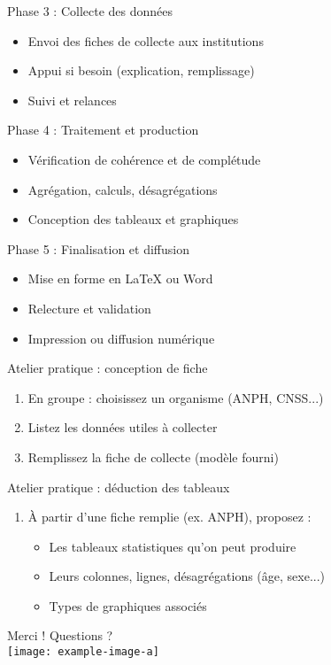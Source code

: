 \documentclass{beamer}
\begin{document}
\begin{frame}{Phase 3 : Collecte des données}
\begin{itemize}
    \item Envoi des fiches de collecte aux institutions
    \item Appui si besoin (explication, remplissage)
    \item Suivi et relances
\end{itemize}
\end{frame}

\begin{frame}{Phase 4 : Traitement et production}
\begin{itemize}
    \item Vérification de cohérence et de complétude
    \item Agrégation, calculs, désagrégations
    \item Conception des tableaux et graphiques
\end{itemize}
\end{frame}

\begin{frame}{Phase 5 : Finalisation et diffusion}
\begin{itemize}
    \item Mise en forme en LaTeX ou Word
    \item Relecture et validation
    \item Impression ou diffusion numérique
\end{itemize}
\end{frame}

\begin{frame}{Atelier pratique : conception de fiche}
\begin{enumerate}
    \item En groupe : choisissez un organisme (ANPH, CNSS...)
    \item Listez les données utiles à collecter
    \item Remplissez la fiche de collecte (modèle fourni)
\end{enumerate}
\end{frame}

\begin{frame}{Atelier pratique : déduction des tableaux}
\begin{enumerate}
    \item À partir d'une fiche remplie (ex. ANPH), proposez :
    \begin{itemize}
        \item Les tableaux statistiques qu'on peut produire
        \item Leurs colonnes, lignes, désagrégations (âge, sexe...)
        \item Types de graphiques associés
    \end{itemize}
\end{enumerate}
\end{frame}

\begin{frame}{Merci !}
\centering
Questions ?\\
\vspace{0.5cm}
\texttt{[image: example-image-a]}
\end{frame}
\end{document}
